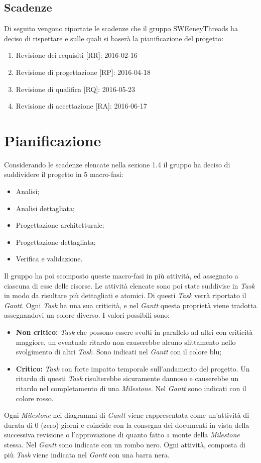 \documentclass[a4paper]{report}
\newcommand{\mychapter}[2]{
	\setcounter{chapter}{#1}
	\setcounter{section}{0}
	\setcounter{subsection}{1}
	\chapter*{#2}
	\addcontentsline{toc}{chapter}{#2}
}
\begin{document}
		\section{Scadenze}
			Di seguito vengono riportate le scadenze che il gruppo SWEeneyThreads ha deciso di rispettare e sulle quali 
			si baserà la pianificazione del progetto:
			\begin{enumerate}
				\item Revisione dei requisiti [RR]: 2016-02-16
				\item Revisione di progettazione [RP]: 2016-04-18
				\item Revisione di qualifica [RQ]: 2016-05-23
				\item Revisione di accettazione [RA]: 2016-06-17
			\end{enumerate}
	\mychapter{2}{Pianificazione}
		Considerando le scadenze elencate nella sezione 1.4 il gruppo ha deciso di suddividere il progetto in 5 
		macro-fasi:
		\begin{itemize}
			\item Analisi;
			\item Analisi dettagliata;
			\item Progettazione architetturale;
			\item Progettazione dettagliata;
			\item Verifica e validazione.
		\end{itemize}
		Il gruppo ha poi scomposto queste macro-fasi in più attività, ed assegnato a ciascuna di esse delle risorse.
		Le attività elencate sono poi state suddivise in \emph{Task} in modo da risultare più dettagliati e atomici.
		Di questi \emph{Task} verrà riportato il \emph{Gantt}. Ogni \emph{Task} ha una sua criticità, 
		e nel \emph{Gantt} questa proprietà viene tradotta assegnandovi un colore diverso. I valori possibili sono:
		\begin{itemize}
			\item \textbf{Non critico:} \emph{Task} che possono essere svolti in parallelo ad altri con criticità maggiore,
			un eventuale ritardo non causerebbe alcuno slittamento nello svolgimento di altri \emph{Task}. Sono indicati nel 
			\emph{Gantt} con il colore blu;
			\item \textbf{Critico:} \emph{Task} con forte impatto temporale sull'andamento del progetto. Un ritardo di questi
			\emph{Task} risulterebbe sicuramente dannoso e causerebbe un ritardo nel completamento di una 
			\emph{Milestone}. Nel \emph{Gantt} sono indicati con il colore rosso.
		\end{itemize}
		Ogni \emph{Milestone} nei diagrammi di \emph{Gantt} viene rappresentata come un'attività di durata di 0 (zero) giorni 
		e coincide con la consegna dei documenti in vista della successiva revisione o l'approvazione di quanto fatto a monte 
		della \emph{Milestone} stessa. Nel \emph{Gantt} sono indicate con un rombo nero.
		Ogni attività, composta di più \emph{Task} viene indicata nel \emph{Gantt} con una barra nera.
		
\end{document}

